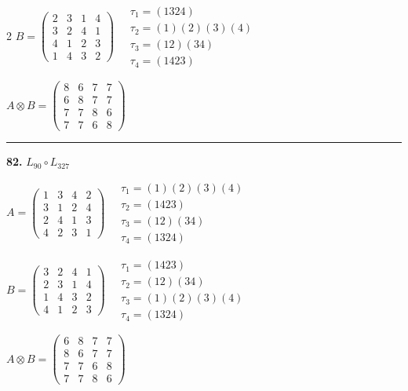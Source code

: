 \begin{multicols}{2}
$B = \begin{pmatrix} 2 & 3 & 1 & 4 \\ 3 & 2 & 4 & 1 \\ 4 & 1 & 2 & 3 \\ 1 & 4 & 3 & 2 \end{pmatrix} \quad \begin{matrix} \tau_{1}=(1 3 2 4) \\ \tau_{2}=(1)(2)(3)(4) \\ \tau_{3}=(1 2)(3 4) \\ \tau_{4}=(1 4 2 3) \end{matrix}$

$A \otimes B = \begin{pmatrix} 8 & 6 & 7 & 7 \\ 6 & 8 & 7 & 7 \\ 7 & 7 & 8 & 6 \\ 7 & 7 & 6 & 8 \end{pmatrix}$

\vspace{0.3em}
\hrule
\vspace{0.3em}

\noindent\textbf{82.} $L_{90} \circ L_{327}$

$A = \begin{pmatrix} 1 & 3 & 4 & 2 \\ 3 & 1 & 2 & 4 \\ 2 & 4 & 1 & 3 \\ 4 & 2 & 3 & 1 \end{pmatrix} \quad \begin{matrix} \tau_{1}=(1)(2)(3)(4) \\ \tau_{2}=(1 4 2 3) \\ \tau_{3}=(1 2)(3 4) \\ \tau_{4}=(1 3 2 4) \end{matrix}$

$B = \begin{pmatrix} 3 & 2 & 4 & 1 \\ 2 & 3 & 1 & 4 \\ 1 & 4 & 3 & 2 \\ 4 & 1 & 2 & 3 \end{pmatrix} \quad \begin{matrix} \tau_{1}=(1 4 2 3) \\ \tau_{2}=(1 2)(3 4) \\ \tau_{3}=(1)(2)(3)(4) \\ \tau_{4}=(1 3 2 4) \end{matrix}$

$A \otimes B = \begin{pmatrix} 6 & 8 & 7 & 7 \\ 8 & 6 & 7 & 7 \\ 7 & 7 & 6 & 8 \\ 7 & 7 & 8 & 6 \end{pmatrix}$


\end{multicols}
